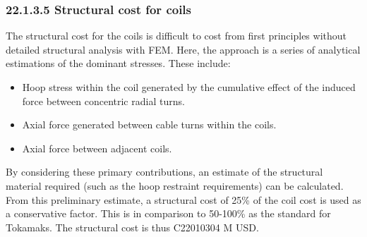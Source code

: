 \subsubsection*{22.1.3.5 Structural cost for coils}

The structural cost for the coils is difficult to cost from first principles without detailed structural analysis with FEM. Here, the approach is a series of analytical estimations of the dominant stresses. These include:

\begin{itemize}
    \item Hoop stress within the coil generated by the cumulative effect of the induced force between concentric radial turns.
    \item Axial force generated between cable turns within the coils. 
    \item Axial force between adjacent coils.
\end{itemize}


By considering these primary contributions, an estimate of the structural material required (such as the hoop restraint requirements) can be calculated. From this preliminary estimate, a structural cost of 25\% of the coil cost is used as a conservative factor. This is in comparison to 50-100\% as the standard for Tokamaks. The structural cost is thus C22010304 M USD.


